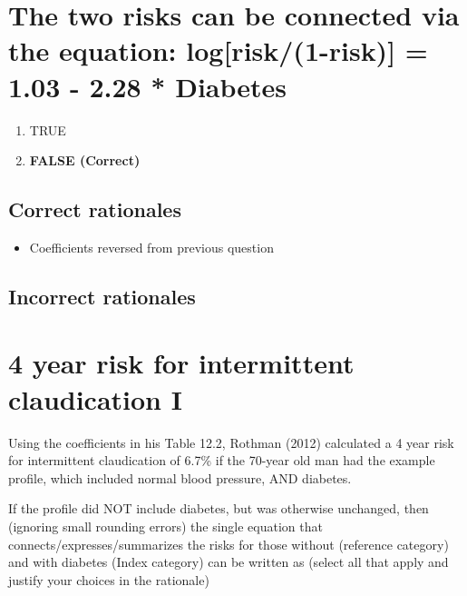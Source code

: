 \documentclass[letterpaper,9pt,twoside,]{pinp}
\providecommand{\tightlist}{%
  \setlength{\itemsep}{0pt}\setlength{\parskip}{0pt}}
\begin{document}
\hypertarget{the-two-risks-can-be-connected-via-the-equation-logrisk1-risk-1.03---2.28-diabetes}{%
\section{The two risks can be connected via the equation:
log{[}risk/(1-risk){]} = 1.03 - 2.28 *
Diabetes}\label{the-two-risks-can-be-connected-via-the-equation-logrisk1-risk-1.03---2.28-diabetes}}

\begin{enumerate}
\def\labelenumi{\alph{enumi}.}
\tightlist
\item
  TRUE
\item
  \textbf{FALSE (Correct)}
\end{enumerate}

\hypertarget{correct-rationales-6}{%
\subsection{Correct rationales}\label{correct-rationales-6}}

\begin{itemize}
\tightlist
\item
  Coefficients reversed from previous question
\end{itemize}

\hypertarget{incorrect-rationales-6}{%
\subsection{Incorrect rationales}\label{incorrect-rationales-6}}

\hypertarget{year-risk-for-intermittent-claudication-i}{%
\section{4 year risk for intermittent claudication
I}\label{year-risk-for-intermittent-claudication-i}}

Using the coefficients in his Table 12.2, Rothman (2012) calculated a 4
year risk for intermittent claudication of 6.7\% if the 70-year old man
had the example profile, which included normal blood pressure, AND
diabetes.

If the profile did NOT include diabetes, but was otherwise unchanged,
then (ignoring small rounding errors) the single equation that
connects/expresses/summarizes the risks for those without (reference
category) and with diabetes (Index category) can be written as (select
all that apply and justify your choices in the rationale)
\end{document}
